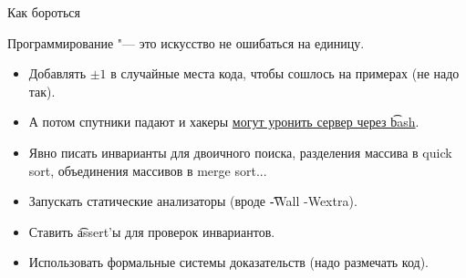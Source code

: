 \begin{frame}{Как бороться}
	\begin{exampleblock}{}
		\large
		\vskip5mm
		Программирование "--- это искусство не ошибаться на единицу.
	\end{exampleblock}
	\begin{itemize}
		\item Добавлять $\pm 1$ в случайные места кода, чтобы сошлось на примерах (не надо так).
		\item А потом спутники падают и хакеры \href{http://www.cvedetails.com/cve/cve-2014-7187}{могут уронить сервер через \t{bash}}.
		\item Явно писать инварианты для двоичного поиска, разделения массива в quick sort, объединения массивов в merge sort...
		\item Запускать статические анализаторы (вроде \t{-Wall -Wextra}).
		\item Ставить \t{assert}'ы для проверок инвариантов.
		\item Использовать формальные системы доказательств (надо размечать код).
	\end{itemize}
\end{frame}
